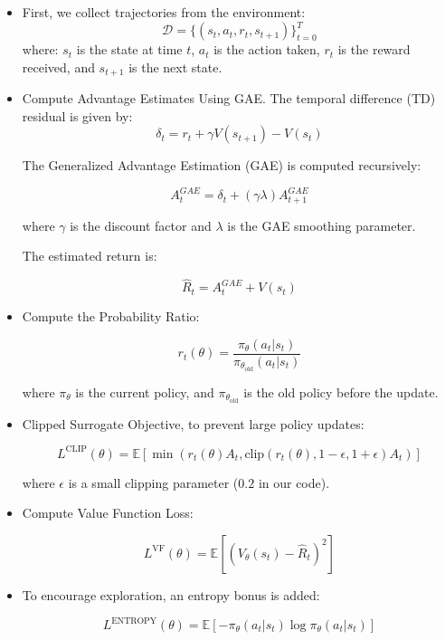 \documentclass[../CSC_52081_EP.tex]{subfiles}
\begin{document}
\begin{itemize}
    \item First, we collect trajectories from the environment:
    \[
    \mathcal{D} = \{ (s_t, a_t, r_t, s_{t+1}) \}_{t=0}^{T}
    \]
    where:
    \( s_t \) is the state at time \( t \), \( a_t \) is the action taken, \( r_t \) is the reward received, and \( s_{t+1} \) is the next state.

    \item Compute Advantage Estimates Using GAE. The temporal difference (TD) residual is given by:
    \[
    \delta_t = r_t + \gamma V(s_{t+1}) - V(s_t)
    \]

    The Generalized Advantage Estimation (GAE) is computed recursively:

    \[
    A_t^{GAE} = \delta_t + (\gamma \lambda) A_{t+1}^{GAE}
    \]

    where \( \gamma \) is the discount factor and \( \lambda \) is the GAE smoothing parameter.

    The estimated return is:

    \[
    \hat{R}_t = A_t^{GAE} + V(s_t)
    \]

    \item Compute the Probability Ratio:

    \[
    r_t(\theta) = \frac{\pi_{\theta}(a_t | s_t)}{\pi_{\theta_{\text{old}}}(a_t | s_t)}
    \]

    where \( \pi_{\theta} \) is the current policy, and \( \pi_{\theta_{\text{old}}} \) is the old policy before the update.

    \item Clipped Surrogate Objective, to prevent large policy updates:

    \[
    L^{\text{CLIP}}(\theta) = \mathbb{E} \left[ \min \left( r_t(\theta) A_t, \text{clip}(r_t(\theta), 1 - \epsilon, 1 + \epsilon) A_t \right) \right]
    \]

    where \( \epsilon \) is a small clipping parameter (\( 0.2 \) in our code).

    \item Compute Value Function Loss:

    \[
    L^{\text{VF}}(\theta) = \mathbb{E} \left[ (V_{\theta}(s_t) - \hat{R}_t)^2 \right]
    \]

    \item To encourage exploration, an entropy bonus is added:

    \[
    L^{\text{ENTROPY}}(\theta) = \mathbb{E} \left[ -\pi_{\theta}(a_t | s_t) \log \pi_{\theta}(a_t | s_t) \right]
    \]


\end{itemize}
\end{document}

